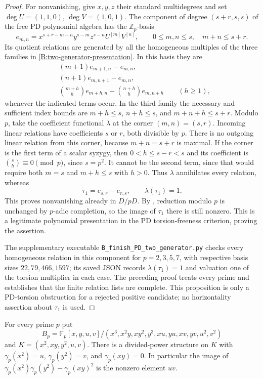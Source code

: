 \begin{proof}
For nonvanishing, give $x,y,z$ their standard multidegrees and set
$\deg U=(1,1,0)$, $\deg V=(1,0,1)$. The component of degree
$(s+r,s,s)$ of the free PD polynomial algebra has the
$\mathbb Z_p$-basis
\[
 e_{m,n}=x^{s+r-m-n}y^{s-m}z^{s-n}U^{[m]}V^{[n]},
 \qquad 0\leq m,n\leq s,\quad m+n\leq s+r.
\]
Its quotient relations are generated by all the homogeneous
multiples of the three families in
\eqref{B:two-generator-presentation}. In this basis they are
\begin{align*}
 &(m+1)e_{m+1,n}-e_{m,n},\\
 &(n+1)e_{m,n+1}-e_{m,n},\\
 &\binom{m+h}{h}e_{m+h,n}
       -\binom{n+h}{h}e_{m,n+h}\qquad(h\geq1),
\end{align*}
whenever the indicated terms occur. In the third family the
necessary and sufficient index bounds are
$m+h\leq s$, $n+h\leq s$, and $m+n+h\leq s+r$.
Modulo $p$, take the coefficient functional $\lambda$ at the
corner $(m,n)=(s,r)$. Incoming linear relations have coefficients
$s$ or $r$, both divisible by $p$. There is no outgoing linear
relation from this corner, because $m+n=s+r$ is maximal.
If the corner is the first term of a scalar syzygy, then
$0<h\leq s-r<s$ and its coefficient is
$\binom{s}{h}\equiv0\pmod p$, since $s=p^2$.
It cannot be the second term, since that would require both
$m=s$ and $m+h\leq s$ with $h>0$.
Thus $\lambda$ annihilates every relation, whereas
\[
 \tau_1=e_{s,r}-e_{r,s},\qquad \lambda(\tau_1)=1.
\]
This proves nonvanishing already in $D/pD$.
By \cite[Lemma 10.96.3, Tag 05GG]{B:StacksCompletion}, reduction
modulo $p$ is unchanged by $p$-adic completion, so the image of
$\tau_1$ there is still nonzero. This is a legitimate polynomial
presentation in the PD torsion-freeness criterion, proving the assertion.

The supplementary executable \texttt{B\_finish\_PD\_two\_generator.py}
checks every homogeneous relation in this component for $p=2,3,5,7$,
with respective basis sizes $22,79,466,1597$; its saved JSON records
$\lambda(\tau_1)=1$ and valuation one of the torsion multiplier in
each case. The preceding proof treats every prime and establishes
that the finite relation lists are complete. This proposition is
only a PD-torsion obstruction for a rejected positive candidate;
no horizontality assertion about $\tau_1$ is used.
\end{proof}


\begin{lemma}
\label{B:finite-PD}
For every prime $p$ put
\[
 B_p=\mathbb F_p[x,y,u,v]/
 (x^3,x^2y,xy^2,y^3,xu,yu,xv,yv,u^2,v^2)
\]
and $K=(x^2,xy,y^2,u,v)$. There is a divided-power structure on $K$
with $\gamma_p(x^2)=u$, $\gamma_p(y^2)=v$, and
$\gamma_p(xy)=0$. In particular the image of
$\gamma_p(x^2)\gamma_p(y^2)-\gamma_p(xy)^2$ is the nonzero element $uv$.
\end{lemma}

